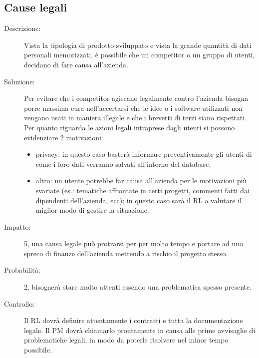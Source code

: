 \subsection{Cause legali}
\begin{description}
\item[Descrizione:] Vista la tipologia di prodotto sviluppato e vista la grande quantità di
dati personali memorizzati, è possibile che un competitor o un gruppo di utenti, decidano di fare causa all'azienda.
\item[Soluzione:] Per evitare che i competitor agiscano legalmente contro l'azienda bisogna porre massima cura nell'accertarsi che le idee o i software utilizzati non vengano usati in maniera illegale e che i brevetti di terzi siano rispettati. Per
quanto riguarda le azioni legali intraprese dagli utenti si possono evidenziare 2
motivazioni:
\begin{itemize}
\item privacy: in questo caso basterà informare preventivamente gli utenti di come
i loro dati verranno salvati all'interno del database.
\item  altro: un utente potrebbe far causa all'azienda per le motivazioni più svariate
(es.: tematiche affrontate in certi progetti, commenti fatti dai dipendenti
dell'azienda, ecc); in questo caso sarà il RL a valutare il miglior modo di
gestire la situazione.
\end{itemize}
\item[Impatto:] 5, una causa legale può protrarsi per per molto tempo e portare ad uno spreco di finanze
dell'azienda mettendo a rischio il progetto stesso.
\item[Probabilità:] 2, bisognerà stare molto attenti essendo una problematica spesso presente.
\item[Controllo:] Il RL dovrà definire attentamente i contratti e tutta la documentazione
legale. Il PM dovrà chiamarlo prontamente in causa alle prime avvisaglie di
problematiche legali, in modo da poterle risolvere nel minor tempo possibile.
\end{description}


